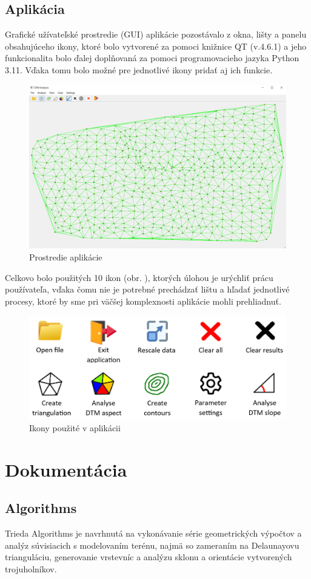 \documentclass[12pt]{article}
\begin{document}
\subsection*{Aplikácia}
Grafické užívateľské prostredie (GUI) aplikácie  pozostávalo z okna, lišty a panelu obsahujúceho ikony, ktoré bolo vytvorené za pomoci knižnice QT (v.4.6.1) a jeho funkcionalita bolo ďalej doplňovaná za pomoci programovacieho jazyka Python 3.11. Vďaka tomu bolo možné pre jednotlivé ikony pridať aj ich funkcie.
\begin{figure}[h]
    \centering
    \includegraphics[width=0.7\linewidth]{latex/images/apk.png}
    \caption{Prostredie aplikácie}
    \label{fig:enter-label}
\end{figure}
\par Celkovo bolo použitých 10 ikon (obr. ), ktorých úlohou je urýchliť prácu používateľa, 
vďaka čomu nie je potrebné prechádzať lištu a hľadať jednotlivé procesy, ktoré by sme pri 
väčšej komplexnosti aplikácie mohli prehliadnuť.
\begin{figure}[h]
    \centering
    \includegraphics[width=0.7\linewidth]{latex/images/icons.png}
    \caption{Ikony použité v aplikácii}
    \label{fig:enter-label}
\end{figure}
\clearpage 
\section*{Dokumentácia}
\subsection*{Algorithms}
Trieda Algorithms je navrhnutá na vykonávanie série geometrických výpočtov a analýz súvisiacich s modelovaním terénu, najmä so zameraním na Delaunayovu trianguláciu, generovanie vrstevníc a analýzu sklonu a orientácie vytvorených trojuholníkov. 
\end{document}
